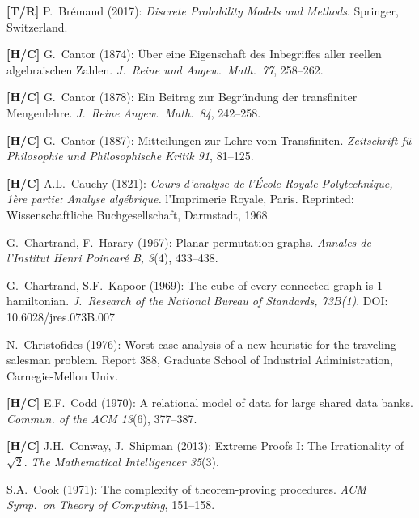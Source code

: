 \begin{thebibliography}{999}
{\bf [T/R]}
P.~Br\' emaud (2017):
{\it Discrete Probability Models and Methods}.  Springer, Switzerland.



{\bf [H/C]}
G.~Cantor (1874): \"{U}ber eine Eigenschaft des Inbegriffes aller
reellen algebraischen Zahlen.  {\it J.~Reine und Angew.~Math.~77}, 258--262.

{\bf [H/C]}
G.~Cantor (1878): Ein Beitrag zur Begr\"{u}ndung der transfiniter
Mengenlehre.  {\it J.~Reine Angew.~Math.~84}, 242--258.

{\bf [H/C]}
G.~Cantor (1887): Mitteilungen zur Lehre vom Transfiniten.
{\it Zeitschrift f\"{u} Philosophie und Philosophische Kritik 91}, 81--125.

{\bf [H/C]}
A.L.~Cauchy (1821): {\it Cours d'analyse de l'\'{E}cole Royale
Polytechnique, 1\`{e}re partie: Analyse alg\'{e}brique.}
l'Imprimerie Royale, Paris.  Reprinted: Wissenschaftliche
Buchgesellschaft, Darmstadt, 1968.

G.~Chartrand, F.~Harary (1967): Planar permutation graphs.
{\it Annales de l'Institut Henri Poincar\'{e} B, 3}(4), 433--438.

G.~Chartrand, S.F.~Kapoor (1969):
The cube of every connected graph is 1-hamiltonian.
{\it J.~Research of the National Bureau of Standards, 73B(1)}.  DOI:
10.6028/jres.073B.007


N.~Christofides (1976):
Worst-case analysis of a new heuristic for the traveling salesman problem.  Report 388, Graduate School of Industrial Administration, Carnegie-Mellon Univ.

{\bf [H/C]}
E.F.~Codd (1970):
A relational model of data for large shared data banks.
{\it Commun. of the ACM 13}(6), 377--387.

{\bf [H/C]}
J.H.~Conway, J.~Shipman (2013):
Extreme Proofs I: The Irrationality of $\sqrt{2}$.
{\it The Mathematical Intelligencer 35}(3).

S.A.~Cook (1971): The complexity of theorem-proving procedures.  {\it ACM Symp.~on Theory of Computing}, 151--158.


\end{thebibliography}
